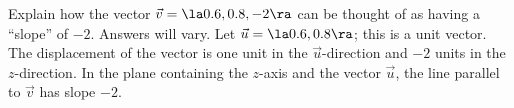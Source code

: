 {Explain how the vector $\vec v=\la 0.6,0.8, -2\ra$ can be thought of as having a ``slope'' of $-2$.
}
{
Answers will vary. Let $\vec u = \la 0.6,0.8\ra$; this is a unit vector. The displacement of the vector is one unit in the $\vec u$-direction and $-2$ units in the $z$-direction. In the plane containing the $z$-axis and the vector $\vec u$, the line parallel to $\vec v$ has slope $-2$.
}